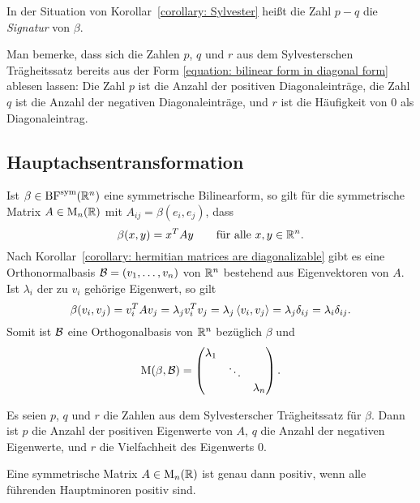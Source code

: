 \begin{definition}
  In der Situation von Korollar~\ref{corollary: Sylvester} heißt die Zahl $p - q$ die \emph{Signatur} von $\beta$.
\end{definition}

Man bemerke, dass sich die Zahlen $p$, $q$ und $r$ aus dem Sylvesterschen Trägheitssatz bereits aus der Form \eqref{equation: bilinear form in diagonal form} ablesen lassen:
Die Zahl $p$ ist die Anzahl der positiven Diagonaleinträge, die Zahl $q$ ist die Anzahl der negativen Diagonaleinträge, und $r$ ist die Häufigkeit von $0$ als Diagonaleintrag.



\subsection{Hauptachsentransformation}

Ist $\beta \in \operatorname{BF}^{\operatorname{sym}}(\mathbb{R}^n)$ eine symmetrische Bilinearform, so gilt für die symmetrische Matrix $A \in \operatorname{M}_{n}(\mathbb{R})$ mit $A_{ij} = \beta(e_i, e_j)$, dass
\[
    \beta(x,y)
  = x^T A y
  \qquad
  \text{für alle $x, y \in \mathbb{R}^n$}.
\]
Nach Korollar~\ref{corollary: hermitian matrices are diagonalizable} gibt es eine Orthonormalbasis $\mathcal{B} = (v_1, \dotsc, v_n)$ von $\mathbb{R}^n$ bestehend aus Eigenvektoren von $A$.
Ist $\lambda_i$ der zu $v_i$ gehörige Eigenwert, so gilt
\[
    \beta(v_i, v_j)
  = v_i^T A v_j
  = \lambda_j v_i^T v_j
  = \lambda_j \left\langle v_i, v_j \right\rangle
  = \lambda_j \delta_{ij}
  = \lambda_i \delta_{ij}.
\]
Somit ist $\mathcal{B}$ eine Orthogonalbasis von $\mathbb{R}^n$ bezüglich $\beta$ und
\[
    \operatorname{M}(\beta, \mathcal{B})
  = \begin{pmatrix}
      \lambda_1 &         &           \\
                & \ddots  &           \\
                &         & \lambda_n
    \end{pmatrix}.
\]

\begin{proposition}
  Es seien $p$, $q$ und $r$ die Zahlen aus dem Sylvesterscher Trägheitssatz für $\beta$.
  Dann ist $p$ die Anzahl der positiven Eigenwerte von $A$, $q$ die Anzahl der negativen Eigenwerte, und $r$ die Vielfachheit des Eigenwerts $0$.
\end{proposition}


\begin{lemma}[Hauptminorenkriterium]
  Eine symmetrische Matrix $A \in \operatorname{M}_{n}(\mathbb{R})$ ist genau dann positiv, wenn alle führenden Hauptminoren positiv sind.
\end{lemma}





